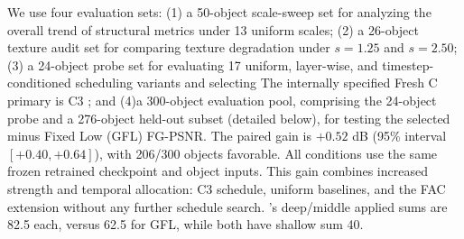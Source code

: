\documentclass[times,twocolumn,final]{elsarticle}
\providecommand{\DIFadd}[1]{{\protect\color{blue} \sf #1}} %
\providecommand{\DIFdel}[1]{{\protect\color{red} \scriptsize #1}} %
\providecommand{\DIFaddbegin}{} %
\providecommand{\DIFaddend}{} %
\providecommand{\DIFdelbegin}{} %
\providecommand{\DIFdelend}{} %
\begin{document}
\DIFdelbegin \DIFdel{We use four evaluation sets: (1) a 50-object scale-sweep set for analyzing the overall trend of structural metrics under 13 uniform scales; (2) a 26-object texture audit set for comparing texture degradation under $s = 1.25$ and $s = 2.50$; (3) a 24-object probe set for evaluating 17 uniform, layer-wise, and timestep-conditioned scheduling variants and selecting }\DIFdelend \DIFaddbegin \DIFadd{The internally specified Fresh C primary is }\DIFaddend C3 \DIFdelbegin \DIFdel{; and (4)a 300-object evaluation pool, comprising the 24-object probe and a 276-object held-out subset (detailed below), for testing the selected }\DIFdelend \DIFaddbegin \DIFadd{minus Fixed Low (GFL) FG-PSNR. The paired gain is $+0.52$ dB (95\% interval $[+0.40,+0.64]$), with 206/300 objects favorable. All conditions use the same frozen retrained checkpoint and object inputs. This gain combines increased strength and temporal allocation: }\DIFaddend C3\DIFdelbegin \DIFdel{schedule, uniform baselines, and the FAC extension without any further schedule search. }\DIFdelend \DIFaddbegin \DIFadd{'s deep/middle applied sums are 82.5 each, versus 62.5 for GFL, while both have shallow sum 40.
}\DIFaddend 
\end{document}
